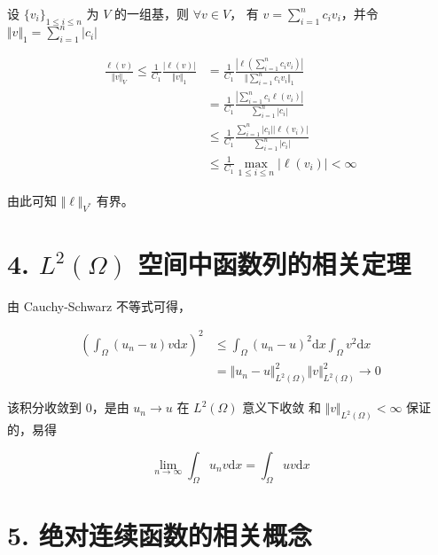 \documentclass[a4paper]{article}
\begin{document}
设 $\{v_i\}_{1\leq i \leq n}$ 为 $V$ 的一组基，则 $\forall v \in V$，
有 $v = \sum_{i=1}^{n}c_i v_i$，并令 $\Vert v\Vert_1 = \sum_{i=1}^{n}|c_i|$

\begin{equation}
    \begin{aligned}
        \frac{\ell(v)}{\Vert v \Vert_V}
        \leq \frac{1}{C_1} \frac{|\ell(v)|}{\Vert v \Vert_{1}}
        &= \frac{1}{C_1} \frac{|\ell(\sum_{i=1}^{n}c_i v_i)|}{\Vert \sum_{i=1}^{n}c_i v_i \Vert_{1}}\\
        &= \frac{1}{C_1} \frac{|\sum_{i=1}^{n}c_i \ell(v_i)|}{\sum_{i=1}^{n}|c_i|}\\
        &\leq \frac{1}{C_1} \frac{\sum_{i=1}^{n}|c_i| |\ell(v_i)|}
            {\sum_{i=1}^{n}|c_i|}\\
        &\leq \frac{1}{C_1} \max_{1\leq i \leq n} |\ell(v_i)| < \infty   
    \end{aligned}
\end{equation}

由此可知 $\Vert \ell \Vert_{V^{*}}$ 有界。

\section*{4. $L^2(\Omega)$ 空间中函数列的相关定理}

由 Cauchy-Schwarz 不等式可得，

\begin{equation}
    \begin{aligned}
        \left(
            \int_{\Omega} (u_n - u) v \text{d}x
        \right)^2
        &\leq \int_{\Omega} (u_n - u)^2 \text{d}x
            \int_{\Omega} v^2 \text{d}x\\
        &= \Vert u_n - u \Vert^2_{L^2(\Omega)} \Vert v \Vert^2_{L^2(\Omega)}
        \rightarrow 0
    \end{aligned}
\end{equation}

该积分收敛到 $0$，是由 $u_n \rightarrow u$ 在 $L^2(\Omega)$ 意义下收敛
和 $\Vert v \Vert_{L^2(\Omega)}< \infty$ 保证的，易得

\begin{equation}
    \lim_{n \rightarrow \infty} \int_{\Omega} u_n v \text{d}x
    = \int_{\Omega} u v \text{d}x
\end{equation}

\section*{5. 绝对连续函数的相关概念}
\end{document}
